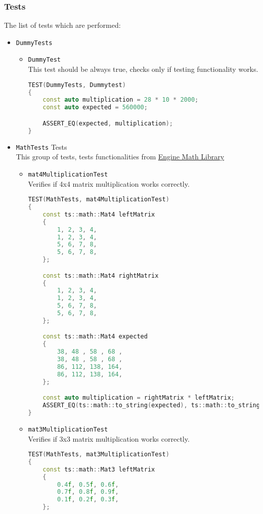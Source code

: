 \subsubsection{Tests}
The list of tests which are performed:
\begin{itemize}
    \item \texttt{DummyTests}
        \begin{itemize}
            \item \texttt{DummyTest}\\
            This test should be always true, checks only if testing functionality works.
\begin{lstlisting}[language=c++, caption=Dummytest test(./engine/tests/tester.cpp)]
TEST(DummyTests, Dummytest)
{
    const auto multiplication = 28 * 10 * 2000;
    const auto expected = 560000;

    ASSERT_EQ(expected, multiplication);
}
\end{lstlisting}
        \end{itemize}
    \item \texttt{MathTests} Tests\\
        This group of tests, tests functionalities from \hyperref[sec:math]{Engine Math Library}
        \begin{itemize}
            \item \texttt{mat4MultiplicationTest}\\
            Verifies if 4x4 matrix multiplication works correctly.
\begin{lstlisting}[language=c++, caption=mat4MultiplicationTest test(./engine/tests/tester.cpp)]
TEST(MathTests, mat4MultiplicationTest)
{
    const ts::math::Mat4 leftMatrix
    {
        1, 2, 3, 4,
        1, 2, 3, 4,
        5, 6, 7, 8,
        5, 6, 7, 8,
    };

    const ts::math::Mat4 rightMatrix
    {
        1, 2, 3, 4,
        1, 2, 3, 4,
        5, 6, 7, 8,
        5, 6, 7, 8,
    };

    const ts::math::Mat4 expected
    {
        38, 48 , 58 , 68 ,
        38, 48 , 58 , 68 ,
        86, 112, 138, 164,
        86, 112, 138, 164,
    };

    const auto multiplication = rightMatrix * leftMatrix;
    ASSERT_EQ(ts::math::to_string(expected), ts::math::to_string(multiplication));
}
\end{lstlisting}
            \item \texttt{mat3MultiplicationTest}\\ Verifies if 3x3 matrix multiplication works correctly.
\begin{lstlisting}[language=c++, caption=mat3MultiplicationTest test(./engine/tests/tester.cpp)]
TEST(MathTests, mat3MultiplicationTest)
{
    const ts::math::Mat3 leftMatrix
    {
        0.4f, 0.5f, 0.6f,
        0.7f, 0.8f, 0.9f,
        0.1f, 0.2f, 0.3f,
    };


\end{lstlisting}
\end{itemize}
\end{itemize}
